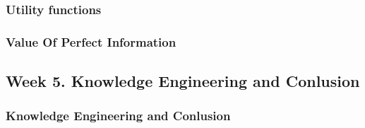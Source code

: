 \documentclass[a4paper,10pt]{article}
\begin{document}
\subsubsection{Utility functions}




\subsubsection{Value Of Perfect Information}



\subsection{Week 5. Knowledge Engineering and Conlusion}

\subsubsection{Knowledge Engineering and Conlusion}


\end{document}

